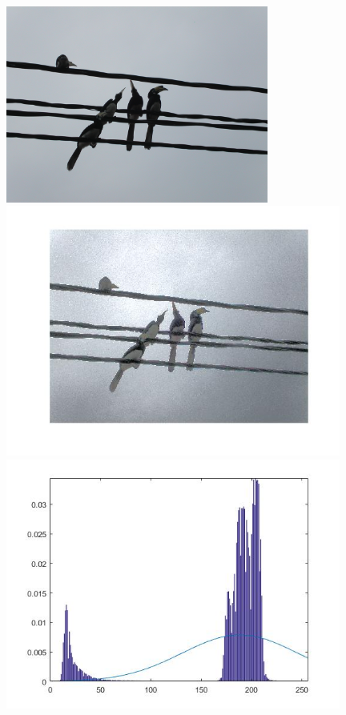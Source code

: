 \documentclass{article}
\begin{document}
\begin{figure}[!hbt]
\centering
\begin{minipage}{0.25\textwidth}
\centering
\includegraphics[width=0.77\textwidth]{../pictures/birds.jpg}
\end{minipage}%
\begin{minipage}{0.25\textwidth}
\centering
\includegraphics[width=0.98\textwidth]{images/p3_birds_xx.jpg}
\end{minipage}%
\begin{minipage}{0.25\textwidth}
\centering
\includegraphics[width=0.98\textwidth]{images/p3_birds_hist.jpg}

\end{minipage}
\end{figure}
\end{document}
